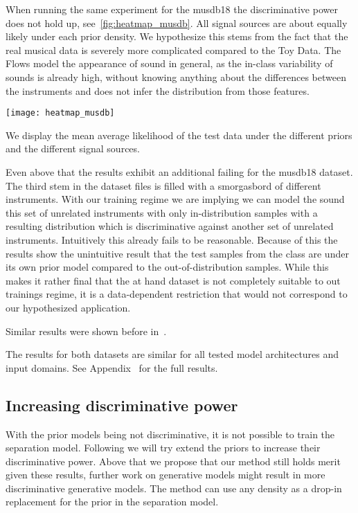 When running the same experiment for the musdb18 the discriminative power does not hold up, see~\cref{fig:heatmap_musdb}. All signal sources are about equally likely under each prior density. We hypothesize this stems from the fact that the real musical data is severely more complicated compared to the Toy Data. The Flows model the appearance of sound in general, as the in-class variability of sounds is already high, without knowing anything about the  differences between the instruments and does not infer the distribution from those features.

\begin{marginfigure}
    \texttt{[image: heatmap\_musdb]}%
    \caption{We display the mean average likelihood of the test data under the different priors and the different signal sources.}%
    \label{fig:heatmap_musdb}
\end{marginfigure}

Even above that the results exhibit an additional failing for the musdb18 dataset. The third stem in the dataset files  is filled with a smorgasbord of different instruments. With our training regime we are implying we can model the sound this set of unrelated instruments with only in-distribution samples with a resulting distribution which is discriminative against another set of unrelated instruments. Intuitively this already fails to be reasonable. Because of this the results show the unintuitive result that the test samples from the  class are  under its own prior model compared to the out-of-distribution samples. While this makes it rather final that the at hand dataset is not completely suitable to out trainings regime, it is a data-dependent restriction that would not correspond to our hypothesized application.

Similar results were shown before in~.

The results for both datasets are similar for all tested model architectures and input domains. See Appendix~ for the full results.

\subsection{Increasing discriminative power}
With the prior models being not discriminative, it is not possible to train the separation model. Following we will try extend the priors to increase their discriminative power. Above that we propose that our method still holds merit given these results, further work on generative models might result in more discriminative generative models. The method can use any density as a drop-in replacement for the prior in the separation model.

